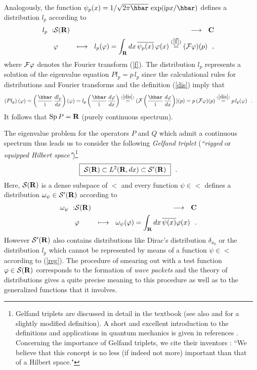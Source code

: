 \documentclass[12pt]{report}
\begin{document}
Analogously, the function 
$\psi_p (x) = 1/\sqrt{2\pi \hbar}
\  {\rm exp} ( \ri px / \hbar)$
defines a distribution $l_p$ according to 
\begin{eqnarray}
\label{dis}
l_p  \ : & {\cal S}({\bf R})  & \longrightarrow \ \ {\bf C}
\\
 & \varphi & \longmapsto \ \
l_p (\varphi ) = \int_{{\bf R}} dx \, \overline{\psi_p (x)} \,
\varphi (x) 
\stackrel{(\ref{f})}{=} 
({\cal F} \varphi ) (p)
\ \ ,
\nonumber
\end{eqnarray}
 where ${\cal F} \varphi$ 
 denotes the Fourier transform 
(\ref{f}).
The distribution $l_p$ represents a solution of the eigenvalue equation 
$Pl_p = p \, l_p$ since the 
calculational rules for distributions and Fourier transforms
\cite{sg,gv} and the definition (\ref{dis}) imply that 
\[
\left( Pl_p \right) (\varphi) =
\left( \ds{\hbar \over \ri} \, \ds{dl_p \over dx} \right) (\varphi)
=
l_p \left( \ds{\hbar \over \ri} \, \ds{d\varphi \over dx} \right) 
\stackrel{(\ref{dis})}{=}
( {\cal F}
\left( \ds{\hbar \over \ri} \, \ds{d\varphi \over dx} \right) ) (p)
= p \, ( {\cal F} \varphi ) (p) 
\stackrel{(\ref{dis})}{=}
p \, l_p (\varphi)
\ \ .
\]
It follows that 
${\rm Sp} \, P = {\bf R}$ (purely continuous spectrum).
 
The eigenvalue problem for the operators $P$ and $Q$ which admit a
continuous spectrum 
thus leads us to consider the following 
{\em Gelfand triplet}
({\em ``rigged} or  {\em equipped 
Hilbert space"})\footnote{Gelfand triplets 
are discussed in detail in the textbook \cite{gv}
(see also \cite{bere} and \cite{jr} 
for a slightly modified definition).
A short and excellent introduction to the definitions 
and applications in quantum mechanics is given in references 
\cite{ber,blt,sg}. Concerning the importance
of Gelfand triplets, we cite their 
inventors \cite{gv}: ``We believe that this concept is no less 
(if indeed not more) 
important than that of a Hilbert space."}
\begin{equation}
\label{tri}
\fbox{\mbox{$ \
{\cal S}({\bf R}) \subset {L^2 ({{\bf R}},dx)} \subset {\cal S}^{\prime} ({\bf R}) \ $}}
\ \ .
\end{equation}
Here, ${\cal S}({\bf R})$ is a dense subspace of $\lt$ \cite{rs}
and every function 
$\psi \in \lt$ defines a distribution $\omega_{\psi} \in {\cal S}^{\prime} ({\bf R})$
according to 
\begin{eqnarray}
\omega_{\psi} \ : & {\cal S}({\bf R}) & \longrightarrow \ \ {\bf C}
\nonumber
\\
 & \varphi & \longmapsto \ \
\omega_{\psi} (\varphi) = \int_{{\bf R}} dx \, \overline{\psi(x)}
\varphi (x)
\ \ .
\label{reg}
\end{eqnarray}
 However ${\cal S}^{\prime} ({\bf R})$ also contains distributions  
 like Dirac's 
  distribution $\delta_{x_0}$ 
or the distribution $l_p$ which cannot be represented 
by means of a function $\psi \in \lt$ according to (\ref{reg}).
The procedure of smearing out with a test function 
$\varphi \in {\cal S}({\bf R})$ corresponds 
to the formation of {\em wave packets} and the theory of 
distributions gives a quite precise meaning to this procedure 
as well as to the generalized functions that it involves.   
\end{document}
